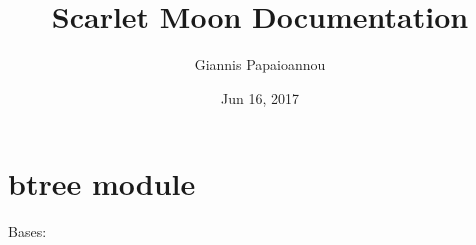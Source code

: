 \documentclass[letterpaper,10pt,english]{sphinxmanual}
\title{Scarlet Moon Documentation}
\date{Jun 16, 2017}
\author{Giannis Papaioannou}
\begin{document}
\maketitle
\sphinxtableofcontents
{}\label{\detokenize{index::doc}}



\chapter{btree module}
\label{\detokenize{btree:module-btree}}\label{\detokenize{btree:btree-module}}\label{\detokenize{btree::doc}}\label{\detokenize{btree:welcome-to-scarlet-moon-s-documentation}}

\begin{fulllineitems}
\label{\detokenize{btree:btree.KeyNode}}
Bases: 

\begin{fulllineitems}
\label{\detokenize{btree:btree.KeyNode.get_value}}
\end{fulllineitems}


\begin{fulllineitems}
\label{\detokenize{btree:btree.KeyNode.idf}}
\end{fulllineitems}


\begin{fulllineitems}
\label{\detokenize{btree:btree.KeyNode.update}}
\end{fulllineitems}


\end{fulllineitems}

\end{document}

